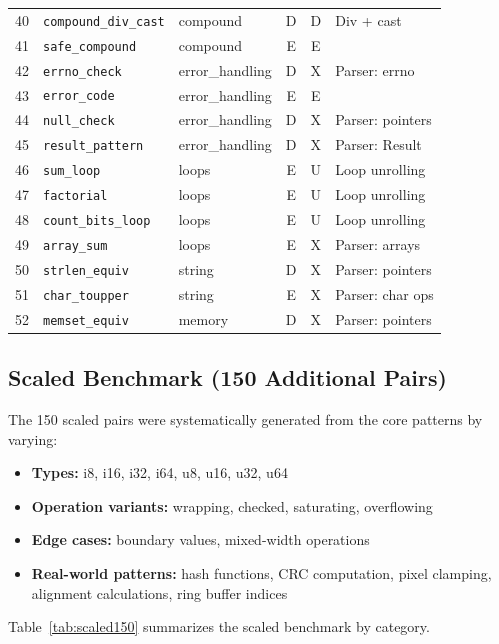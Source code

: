 \documentclass[11pt]{article}
\begin{document}
\begin{table}[H]
\begin{tabular}{@{}rllccl@{}}
40 & \texttt{compound\_div\_cast} & compound & D & D & Div + cast \\
41 & \texttt{safe\_compound}     & compound & E & E & \\
42 & \texttt{errno\_check}       & error\_handling & D & X & Parser: errno \\
43 & \texttt{error\_code}        & error\_handling & E & E & \\
44 & \texttt{null\_check}        & error\_handling & D & X & Parser: pointers \\
45 & \texttt{result\_pattern}    & error\_handling & D & X & Parser: Result \\
46 & \texttt{sum\_loop}          & loops & E & U & Loop unrolling \\
47 & \texttt{factorial}          & loops & E & U & Loop unrolling \\
48 & \texttt{count\_bits\_loop}  & loops & E & U & Loop unrolling \\
49 & \texttt{array\_sum}         & loops & E & X & Parser: arrays \\
50 & \texttt{strlen\_equiv}      & string & D & X & Parser: pointers \\
51 & \texttt{char\_toupper}      & string & E & X & Parser: char ops \\
52 & \texttt{memset\_equiv}      & memory & D & X & Parser: pointers \\
\bottomrule
\end{tabular}
\end{table}

\subsection{Scaled Benchmark (150 Additional Pairs)}

The 150 scaled pairs were systematically generated from the core patterns by
varying:
\begin{itemize}[nosep]
\item \textbf{Types:} i8, i16, i32, i64, u8, u16, u32, u64
\item \textbf{Operation variants:} wrapping, checked, saturating, overflowing
\item \textbf{Edge cases:} boundary values, mixed-width operations
\item \textbf{Real-world patterns:} hash functions, CRC computation, pixel
      clamping, alignment calculations, ring buffer indices
\end{itemize}

Table~\ref{tab:scaled150} summarizes the scaled benchmark by category.
\end{document}
